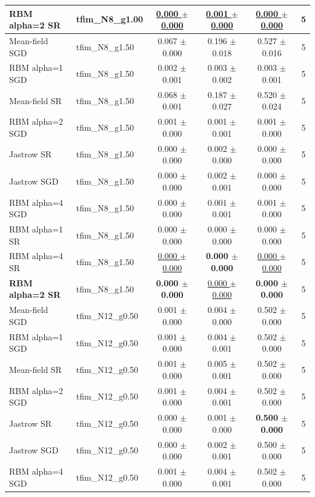 \begin{tabular}{llcccc}
\textbf{RBM alpha=2 SR} & tfim\_N8\_g1.00 & \underline{0.000 $\pm$ 0.000} & \underline{0.001 $\pm$ 0.000} & \underline{0.000 $\pm$ 0.000} & 5 \\
\midrule
Mean-field SGD & tfim\_N8\_g1.50 & 0.067 $\pm$ 0.000 & 0.196 $\pm$ 0.018 & 0.527 $\pm$ 0.016 & 5 \\
RBM alpha=1 SGD & tfim\_N8\_g1.50 & 0.002 $\pm$ 0.001 & 0.003 $\pm$ 0.002 & 0.003 $\pm$ 0.001 & 5 \\
Mean-field SR & tfim\_N8\_g1.50 & 0.068 $\pm$ 0.001 & 0.187 $\pm$ 0.027 & 0.520 $\pm$ 0.024 & 5 \\
RBM alpha=2 SGD & tfim\_N8\_g1.50 & 0.001 $\pm$ 0.000 & 0.001 $\pm$ 0.001 & 0.001 $\pm$ 0.000 & 5 \\
Jastrow SR & tfim\_N8\_g1.50 & 0.000 $\pm$ 0.000 & 0.002 $\pm$ 0.000 & 0.000 $\pm$ 0.000 & 5 \\
Jastrow SGD & tfim\_N8\_g1.50 & 0.000 $\pm$ 0.000 & 0.002 $\pm$ 0.001 & 0.000 $\pm$ 0.000 & 5 \\
RBM alpha=4 SGD & tfim\_N8\_g1.50 & 0.000 $\pm$ 0.000 & 0.001 $\pm$ 0.001 & 0.001 $\pm$ 0.000 & 5 \\
RBM alpha=1 SR & tfim\_N8\_g1.50 & 0.000 $\pm$ 0.000 & 0.000 $\pm$ 0.000 & 0.000 $\pm$ 0.000 & 5 \\
RBM alpha=4 SR & tfim\_N8\_g1.50 & \underline{0.000 $\pm$ 0.000} & \textbf{0.000 $\pm$ 0.000} & \underline{0.000 $\pm$ 0.000} & 5 \\
\textbf{RBM alpha=2 SR} & tfim\_N8\_g1.50 & \textbf{0.000 $\pm$ 0.000} & \underline{0.000 $\pm$ 0.000} & \textbf{0.000 $\pm$ 0.000} & 5 \\
\midrule
Mean-field SGD & tfim\_N12\_g0.50 & 0.001 $\pm$ 0.000 & 0.004 $\pm$ 0.000 & 0.502 $\pm$ 0.000 & 5 \\
RBM alpha=1 SGD & tfim\_N12\_g0.50 & 0.001 $\pm$ 0.000 & 0.004 $\pm$ 0.001 & 0.502 $\pm$ 0.000 & 5 \\
Mean-field SR & tfim\_N12\_g0.50 & 0.001 $\pm$ 0.000 & 0.005 $\pm$ 0.001 & 0.502 $\pm$ 0.000 & 5 \\
RBM alpha=2 SGD & tfim\_N12\_g0.50 & 0.001 $\pm$ 0.000 & 0.004 $\pm$ 0.001 & 0.502 $\pm$ 0.000 & 5 \\
Jastrow SR & tfim\_N12\_g0.50 & 0.000 $\pm$ 0.000 & 0.001 $\pm$ 0.000 & \textbf{0.500 $\pm$ 0.000} & 5 \\
Jastrow SGD & tfim\_N12\_g0.50 & 0.000 $\pm$ 0.000 & 0.002 $\pm$ 0.001 & 0.500 $\pm$ 0.000 & 5 \\
RBM alpha=4 SGD & tfim\_N12\_g0.50 & 0.001 $\pm$ 0.000 & 0.004 $\pm$ 0.001 & 0.502 $\pm$ 0.000 & 5 \\

\end{tabular}
